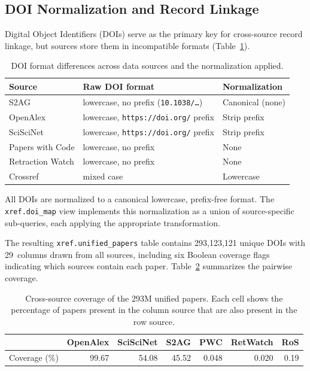 \subsection{DOI Normalization and Record Linkage}
\label{sec:doi}

Digital Object Identifiers (DOIs) serve as the primary key for cross-source record
linkage, but sources store them in incompatible formats (Table~\ref{tab:doi}).

\begin{table}[t]
\centering
\caption{DOI format differences across data sources and the normalization applied.}
\label{tab:doi}
\small
\begin{tabular}{@{}l l l@{}}
\toprule
\textbf{Source} & \textbf{Raw DOI format} & \textbf{Normalization} \\
\midrule
S2AG             & lowercase, no prefix (\texttt{10.1038/\ldots}) & Canonical (none) \\
OpenAlex         & lowercase, \texttt{https://doi.org/} prefix    & Strip prefix \\
SciSciNet        & lowercase, \texttt{https://doi.org/} prefix    & Strip prefix \\
Papers with Code & lowercase, no prefix                           & None \\
Retraction Watch & lowercase, no prefix                           & None \\
Crossref         & mixed case                                     & Lowercase \\
\bottomrule
\end{tabular}
\end{table}

All DOIs are normalized to a canonical lowercase, prefix-free format. The
\texttt{xref.doi\_map} view implements this normalization as a union of
source-specific sub-queries, each applying the appropriate transformation.

The resulting \texttt{xref.unified\_papers} table contains 293,123,121 unique DOIs
with 29~columns drawn from all sources, including six Boolean coverage flags
indicating which sources contain each paper. Table~\ref{tab:overlap} summarizes the
pairwise coverage.

\begin{table}[t]
\centering
\caption{Cross-source coverage of the 293M unified papers. Each cell shows the
percentage of papers present in the column source that are also present in the
row source.}
\label{tab:overlap}
\small
\begin{tabular}{@{}l r r r r r r@{}}
\toprule
 & \textbf{OpenAlex} & \textbf{SciSciNet} & \textbf{S2AG} & \textbf{PWC} & \textbf{RetWatch} & \textbf{RoS} \\
\midrule
Coverage (\%) & 99.67 & 54.08 & 45.52 & 0.048 & 0.020 & 0.19 \\
\bottomrule
\end{tabular}
\end{table}

